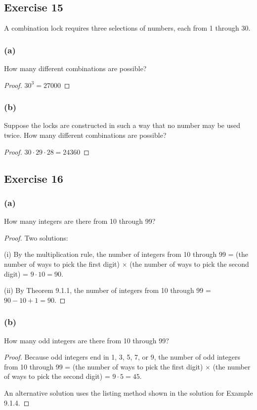 \documentclass[14pt]{extarticle}
\begin{document}
\subsection{Exercise 15}
A combination lock requires three selections of numbers, each from 1 through 30.

\subsubsection{(a)}
How many different combinations are possible?

\begin{proof}
     \(30^3 = 27000\)
\end{proof}

\subsubsection{(b)}
Suppose the locks are constructed in such a way that no number may be used twice. How many different combinations
are possible?

\begin{proof}
     \(30 \cdot 29 \cdot 28 = 24360\)
\end{proof}

\subsection{Exercise 16}
\subsubsection{(a)}
How many integers are there from 10 through 99?

\begin{proof}
     Two solutions:

     (i) By the multiplication rule, the number of integers from 10 through 99 = (the number of ways to pick the first
     digit) \(\times\) (the number of ways to pick the second digit) = \(9 \cdot 10 = 90\).

     (ii) By Theorem 9.1.1, the number of integers from 10 through 99 = \(90 - 10 + 1 = 90\).
\end{proof}

\subsubsection{(b)}
How many odd integers are there from 10 through 99?

\begin{proof}
     Because odd integers end in 1, 3, 5, 7, or 9, the number of odd integers from 10 through 99 = (the number of ways to
     pick the first digit) \(\times\) (the number of ways to pick the second digit) = \(9 \cdot 5 = 45\).

     An alternative solution uses the listing method shown in the solution for Example 9.1.4.
\end{proof}
\end{document}
